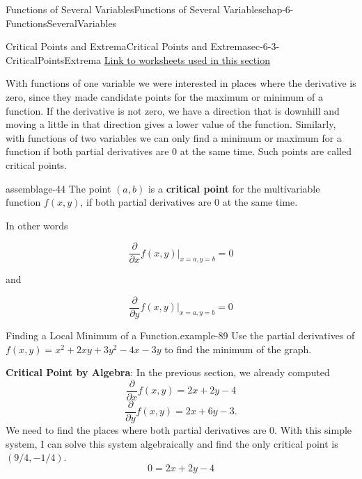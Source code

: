 \documentclass[oneside,10pt,]{book}
\newcommand{\terminology}[1]{\textbf{#1}}
\numberwithin{equation}{section}
\begin{document}
\begin{chapterptx}{Functions of Several Variables}{}{Functions of Several Variables}{}{}{chap-6-FunctionsSeveralVariables}
\begin{sectionptx}{Critical Points and Extrema}{}{Critical Points and Extrema}{}{}{sec-6-3-CriticalPointsExtrema}
\hypertarget{p-2324}{}%
\href{./Examples/Section-6-3-Examples.xlsx}{Link to worksheets used in this section}%
\par
\hypertarget{p-2325}{}%
With functions of one variable we were interested in places where the derivative is zero, since they made candidate points for the maximum or minimum of a function.  If the derivative is not zero, we have a direction that is downhill and moving a little in that direction gives a lower value of the function.  Similarly, with functions of two variables we can only find a minimum or maximum for a function if both partial derivatives are 0 at the same time.  Such points are called critical points.%
\begin{assemblage}{}{assemblage-44}%
\hypertarget{p-2326}{}%
The point \((a,b)\) is a \terminology{critical point} for the multivariable function \(f(x,y)\), if both partial derivatives are 0 at the same time.%
\par
\hypertarget{p-2327}{}%
In other words%
\par
\hypertarget{p-2328}{}%
%
\begin{equation*}
\frac{\partial }{\partial x} f(x,y)|_{x=a,y=b}=0
\end{equation*}
%
\par
\hypertarget{p-2329}{}%
and%
\par
\hypertarget{p-2330}{}%
%
\begin{equation*}
\frac{\partial }{\partial y} f(x,y)|_{x=a,y=b}=0
\end{equation*}
%
\end{assemblage}
\begin{example}{Finding a Local Minimum of a Function.}{example-89}%
\hypertarget{p-2331}{}%
Use the partial derivatives of \(f(x,y)=x^2+ 2xy+3y^2-4x-3y\) to find the minimum of the graph.%
\par
\hypertarget{p-2332}{}%
\terminology{Critical Point by Algebra}:  In the previous section, we already computed%
%
\begin{equation*}
\frac{\partial }{\partial x} f(x,y)=2x+2y-4
\end{equation*}
%
\begin{equation*}
\frac{\partial }{\partial y} f(x,y)=2x+6y-3.
\end{equation*}
\hypertarget{p-2333}{}%
We need to find the places where both partial derivatives are 0.  With this simple system, I can solve this system algebraically and find the only critical point is \((9/4, -1/4)\).%
%
\begin{equation*}
0=2x+2y-4

\end{equation*}
\end{example}
\end{sectionptx}
\end{chapterptx}
\end{document}
